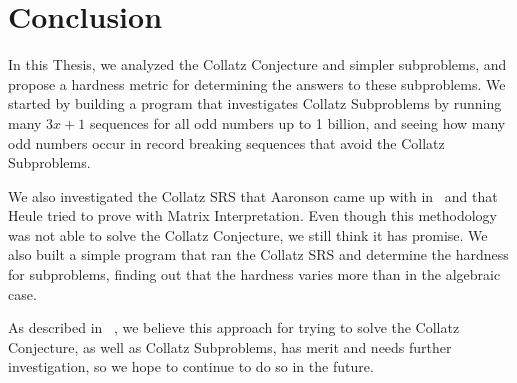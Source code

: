 \documentclass[12pt]{article}
\theoremstyle{definition}
\begin{document}
\section{Conclusion} \label{sec:conclusion}
In this Thesis, we analyzed the Collatz Conjecture and simpler subproblems, and propose a hardness metric for determining the answers to these subproblems. We started by building a program that investigates Collatz Subproblems by running many $3x+1$ sequences for all odd numbers up to 1 billion, and seeing how many odd numbers occur in record breaking sequences that avoid the Collatz Subproblems. \par
We also investigated the Collatz SRS that Aaronson came up with in~\cite{HeuleAaronson} and that Heule tried to prove with Matrix Interpretation. Even though this methodology was not able to solve the Collatz Conjecture, we still think it has promise. We also built a simple program that ran the Collatz SRS and determine the hardness for subproblems, finding out that the hardness varies more than in the algebraic case.\par
As described in ~\cite{HeuleAaronson}, we believe this approach for trying to solve the Collatz Conjecture, as well as Collatz Subproblems, has merit and needs further investigation, so we hope to continue to do so in the future.
\printbibliography
\end{document}
